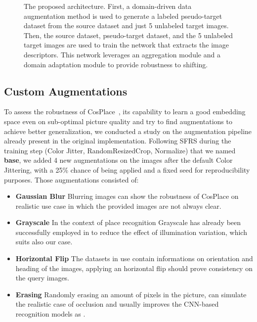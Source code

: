 \documentclass[10pt,twocolumn,letterpaper]{article}
\begin{document}
\begin{figure*}
  \centering
  \begin{subfigure}{1.0\linewidth}
    \centering
  
  \end{subfigure}
     \caption{The proposed architecture. First, a domain-driven data augmentation method is used to generate a labeled pseudo-target dataset from the source dataset and just 5 unlabeled target images. Then, the source dataset, pseudo-target dataset, and the 5 unlabeled target images are used to train the network that extracts the image descriptors. This network leverages an aggregation module and a domain adaptation module to provide robustness to shifting.}
    \label{fig:our_architecture}
  \hfill
\end{figure*}


\subsection{Custom Augmentations}
To assess the robustness of CosPlace~\cite{Berton_CVPR_2022_CosPlace}, its capability to learn a good embedding space even on sub-optimal picture quality and try to find augmentations to achieve better generalization,
we conducted a study on the augmentation pipeline already present in the original implementation. Following SFRS \cite{sfrs} during the training step (Color Jitter, RandomResizedCrop, Normalize) that we named \textbf{base}, we added 4 new augmentations on the images after the default Color Jittering, with a 25\%  chance of being applied and a fixed seed for reproducibility purposes. Those augmentations consisted of:
\begin{itemize}
  \item \textbf{Gaussian Blur}\newline
Blurring images can show the robustness of CosPlace on realistic use case in which the provided images are not always clear.
  \item \textbf{Grayscale}\newline
  In the context of place recognition Grayscale has already been successfully employed in \cite{grayscalecnn} to reduce the effect of illumination variation, which suits also our case.
  \item \textbf{Horizontal Flip}\newline
The datasets in use contain informations on orientation and heading of the images, applying an horizontal flip should prove consistency on the query images. 
  \item \textbf{Erasing}\newline
Randomly erasing an amount of pixels in the picture, can simulate the realistic case of occlusion and usually improves the CNN-based recognition models as \cite{reda}.
\end{itemize}
\end{document}
